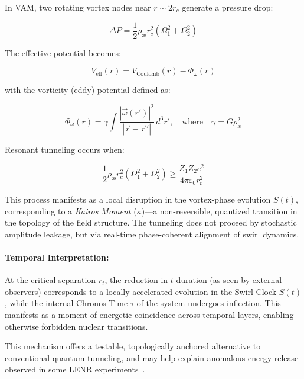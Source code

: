 In VAM, two rotating vortex nodes near \( r \sim 2r_c \) generate a pressure drop:

\begin{equation}
    \Delta P = \frac{1}{2} \rho_\text{\ae} r_c^2 (\Omega_1^2 + \Omega_2^2)
\end{equation}

The effective potential becomes:

\begin{equation}
    V_\text{eff}(r) = V_\text{Coulomb}(r) - \Phi_\omega(r)
\end{equation}

with the vorticity (eddy) potential defined as:

\begin{equation}
    \Phi_\omega(r) = \gamma \int \frac{|\vec{\omega}(r')|^2}{|\vec{r} - \vec{r}'|} \, d^3r',
    \quad \text{where} \quad \gamma = G \rho_\text{\ae}^2
\end{equation}

Resonant tunneling occurs when:

\begin{equation}
    \frac{1}{2} \rho_\text{\ae} r_c^2 (\Omega_1^2 + \Omega_2^2) \geq \frac{Z_1 Z_2 e^2}{4\pi \varepsilon_0 r_t^2}
\end{equation}

This process manifests as a local disruption in the vortex-phase evolution \(S(t)\), corresponding to a \emph{Kairos Moment} (\(\kappa\))—a non-reversible, quantized transition in the topology of the field structure. The tunneling does not proceed by stochastic amplitude leakage, but via real-time phase-coherent alignment of swirl dynamics.

\paragraph{Temporal Interpretation:}

At the critical separation \(r_t\), the reduction in \(\bar{t}\)-duration (as seen by external observers) corresponds to a locally accelerated evolution in the Swirl Clock \(S(t)\), while the internal Chronos-Time \(\tau\) of the system undergoes inflection. This manifests as a moment of energetic coincidence across temporal layers, enabling otherwise forbidden nuclear transitions.

This mechanism offers a testable, topologically anchored alternative to conventional quantum tunneling, and may help explain anomalous energy release observed in some LENR experiments~\cite{Storms2021}.
